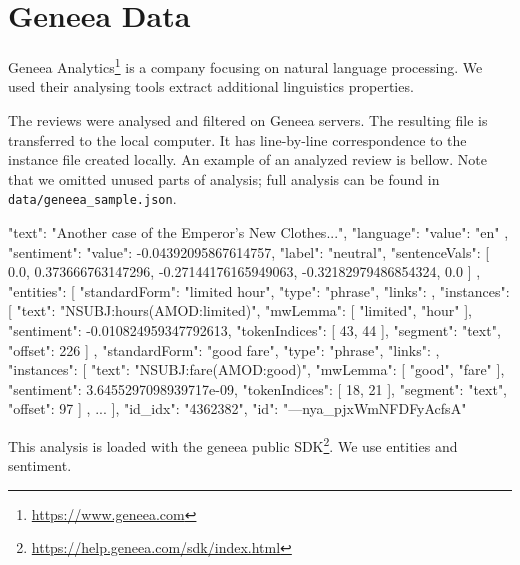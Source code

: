 \chapter{Geneea Data}\label{app:geneea}

Geneea Analytics\footnote{\url{https://www.geneea.com}} is a company focusing on natural language processing.
We used their analysing tools extract additional linguistics properties.

The reviews were analysed and filtered on Geneea servers.
The resulting file is transferred to the local computer.
It has line-by-line correspondence to the instance file created locally.
An example of an analyzed review is bellow.
Note that we omitted unused parts of analysis; full analysis can be found in \texttt{data/geneea\_sample.json}.

\begin{code}
{
  "text": "Another case of the Emperor's New Clothes...",
  "language": {
    "value": "en"
  },
  "sentiment": {
    "value": -0.04392095867614757,
    "label": "neutral",
    "sentenceVals": [
      0.0,
      0.373666763147296,
      -0.27144176165949063,
      -0.32182979486854324,
      0.0
    ]
  },
  "entities": [
    {
      "standardForm": "limited hour",
      "type": "phrase",
      "links": {},
      "instances": [
        {
          "text": "NSUBJ:hours(AMOD:limited)",
          "mwLemma": [
            "limited",
            "hour"
          ],
          "sentiment": -0.010824959347792613,
          "tokenIndices": [
            43,
            44
          ],
          "segment": "text",
          "offset": 226
        }
      ]
    },
    {
      "standardForm": "good fare",
      "type": "phrase",
      "links": {},
      "instances": [
        {
          "text": "NSUBJ:fare(AMOD:good)",
          "mwLemma": [
            "good",
            "fare"
          ],
          "sentiment": 3.6455297098939717e-09,
          "tokenIndices": [
            18,
            21
          ],
          "segment": "text",
          "offset": 97
        }
      ]
    },
	...
  ],
  "id_idx": "4362382",
  "id": "---nya_pjxWmNFDFyAcfsA"
}

\end{code}

This analysis is loaded with the geneea public SDK\footnote{\url{https://help.geneea.com/sdk/index.html}}.
We use entities and sentiment.
